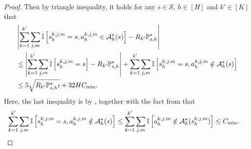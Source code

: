 \documentclass{article}
\begin{document}
\begin{proof}
Then by triangle inequality, it holds for any $s \in \mathcal{S}$, $h \in [H]$ and $k' \in [K]$ that
\begin{align}
    \label{optimalvisitin}
     &\left|\sum_{k = 1}^{k'} \sum_{j,m}\mathbb{I}\left[s_{h}^{k,j,m} = s, a_{h}^{k,j,m} \in \mathcal{A}_h^{\star}(s)\right] - R_{k'}\mathbb{P}_{s,h}^{\star}\right| \nonumber\\
     &\leq \left|\sum_{k = 1}^{k'} \sum_{j,m}\mathbb{I}\left[s_{h}^{k,j,m} = s\right] - R_{k'}\mathbb{P}_{s,h}^{\star}\right| + \sum_{k = 1}^{k'} \sum_{j,m}\mathbb{I}\left[s_{h}^{k,j,m} = s, a_{h}^{k,j,m} \notin \mathcal{A}_h^{\star}(s)\right] \nonumber\\
     &\leq 5\sqrt{R_{k'}\mathbb{P}_{s,h}^{\star}\iota} + 32HC_{\textnormal{min}}.
\end{align}
Here, the last inequality is by , together with the fact from  that
\begin{align*}
    &\sum_{k = 1}^{k'} \sum_{j,m}\mathbb{I}\left[s_{h}^{k,j,m} = s, a_{h}^{k,j,m} \notin \mathcal{A}_h^{\star}(s)\right] \leq \sum_{k = 1}^{k'} \sum_{j,m}\mathbb{I}\left[a_{h}^{k,j,m} \notin \mathcal{A}    _h^{\star}(s_{h}^{k,j,m})\right] \leq C_{\textnormal{min}}.
\end{align*}


\end{proof}
\end{document}
